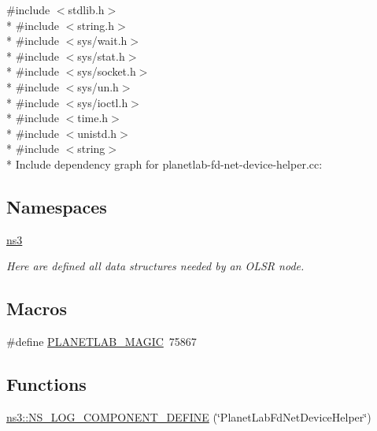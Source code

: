 {\ttfamily \#include $<$stdlib.\+h$>$}\\*
{\ttfamily \#include $<$string.\+h$>$}\\*
{\ttfamily \#include $<$sys/wait.\+h$>$}\\*
{\ttfamily \#include $<$sys/stat.\+h$>$}\\*
{\ttfamily \#include $<$sys/socket.\+h$>$}\\*
{\ttfamily \#include $<$sys/un.\+h$>$}\\*
{\ttfamily \#include $<$sys/ioctl.\+h$>$}\\*
{\ttfamily \#include $<$time.\+h$>$}\\*
{\ttfamily \#include $<$unistd.\+h$>$}\\*
{\ttfamily \#include $<$string$>$}\\*
Include dependency graph for planetlab-\/fd-\/net-\/device-\/helper.cc\+:
\subsection*{Namespaces}
\begin{DoxyCompactItemize}
\item 
 \hyperlink{namespacens3}{ns3}
\begin{DoxyCompactList}\small\item\em Here are defined all data structures needed by an O\+L\+SR node. \end{DoxyCompactList}\end{DoxyCompactItemize}
\subsection*{Macros}
\begin{DoxyCompactItemize}
\item 
\#define \hyperlink{planetlab-fd-net-device-helper_8cc_a15008ade4323f5ef598ad5a66b141e42}{P\+L\+A\+N\+E\+T\+L\+A\+B\+\_\+\+M\+A\+G\+IC}~75867
\end{DoxyCompactItemize}
\subsection*{Functions}
\begin{DoxyCompactItemize}
\item 
\hyperlink{namespacens3_af66ff436722537329867afee13bc33fa}{ns3\+::\+N\+S\+\_\+\+L\+O\+G\+\_\+\+C\+O\+M\+P\+O\+N\+E\+N\+T\+\_\+\+D\+E\+F\+I\+NE} (\char`\"{}Planet\+Lab\+Fd\+Net\+Device\+Helper\char`\"{})
\end{DoxyCompactItemize}


